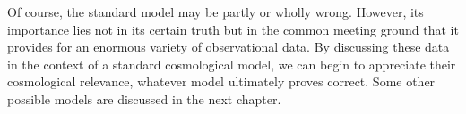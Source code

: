 Of course, the standard model may be partly or wholly wrong. However, its
importance lies not in its certain truth but in the common meeting ground that it
provides for an enormous variety of observational data. By discussing these data
in the context of a standard cosmological model, we can begin to appreciate their
cosmological relevance, whatever model ultimately proves correct. Some other
possible models are discussed in the next chapter.

